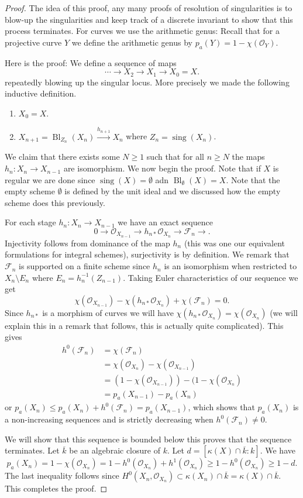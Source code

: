 \documentclass[12pt]{article}
\numberwithin{equation}{section}
\theoremstyle{definition}
\theoremstyle{remark}
\newcommand{\Ocal}{\mathcal{O}}
\newcommand{\Bl}{\operatorname{Bl}}
\newcommand{\Fcal}{\mathcal{F}}
\newcommand{\sing}{\operatorname{sing}}
\begin{document}
\begin{proof}
	The idea of this proof, any many proofs of resolution of singularities is to blow-up the singularities and keep track of a discrete invariant to show that this process terminates. 
	For curves we use the arithmetic genus:
	Recall that for a projective curve $Y$ we define the arithmetic genus by $p_a(Y) = 1-\chi(\Ocal_Y)$.
	
	Here is the proof: 
	We define a sequence of maps 
	$$ \cdots \to X_2 \to X_1 \to X_0=X. $$
	repeatedly blowing up the singular locus.
	More precisely we made the following inductive definition.
	\begin{enumerate}
		\item $X_0=X$.
		\item $X_{n+1} = \Bl_{Z_n}(X_n) \xrightarrow{h_{n+1}} X_n$ where $Z_n = \sing(X_n)$.
	\end{enumerate}
	We claim that there exists some $N\geq 1$ such that for all $n\geq N$ the maps $h_n: X_n \to X_{n-1}$ are isomorphism. 
	We now begin the proof. 
	Note that if $X$ is regular we are done since $\sing(X)=\emptyset$ adn $\Bl_{\emptyset}(X)=X$. 
	Note that the empty scheme $\emptyset$ is defined by the unit ideal and we discussed how the empty scheme does this previously. 
	
	For each stage $h_n:X_n \to X_{n-1}$ we have an exact sequence 
	$$0 \to \Ocal_{X_{n-1}} \to h_{n*}\Ocal_{X_n} \to \Fcal_n \to. $$
	Injectivity follows from dominance of the map $h_n$ (this was one our equivalent formulations for integral schemes), surjectivity is by definition. 
	We remark that $\Fcal_n$ is supported on a finite scheme since $h_n$ is an isomorphism when restricted to $X_n\setminus E_n$ where $E_n=h_n^{-1}(Z_{n-1})$.
	Taking Euler characteristics of our sequence we get 
	$$\chi(\Ocal_{X_{n-1}}) - \chi(h_{n*}\Ocal_{X_n}) + \chi(\Fcal_n) =0.$$
	Since $h_{n*}$ is a morphism of curves we will have $\chi(h_{n*}\Ocal_{X_n}) =\chi(\Ocal_{X_n})$ (we will explain this in a remark that follows, this is actually quite complicated). 
	This gives 
	\begin{align*}
	h^0(\Fcal_n) &= \chi(\Fcal_n) \\
	&= \chi(\Ocal_{X_n}) - \chi(\Ocal_{X_{n-1}}) \\
	&=(1-\chi(\Ocal_{X_{n-1}})) - (1-\chi(\Ocal_{X_n}) \\
	&= p_a(X_{n-1}) - p_a(X_n) 
	\end{align*}
	or $p_a(X_n) \leq p_a(X_n) + h^0(\Fcal_n) = p_a(X_{n-1})$, which shows that $p_a(X_n)$ is a non-increasing sequences and is strictly decreasing when $h^0(\Fcal_n)\neq 0$. 
	
	We will show that this sequence is bounded below this proves that the sequence terminates. 
	Let $\overline{k}$ be an algebraic closure of $k$. 
	Let $d = [\kappa(X)\cap \overline{k}:k]$. 
	We have 
	$$p_a(X_n) = 1-\chi(\Ocal_{X_n}) = 1-h^0(\Ocal_{X_n}) + h^1(\Ocal_{X_n}) \geq 1-h^0(\Ocal_{X_n}) \geq 1-d.$$
	The last inequality follows since $H^0(X_n,\Ocal_{X_n}) \subset \kappa(X_n) \cap \overline{k} = \kappa(X) \cap \overline{k}$. 
	This completes the proof. 
\end{proof}
\end{document}
